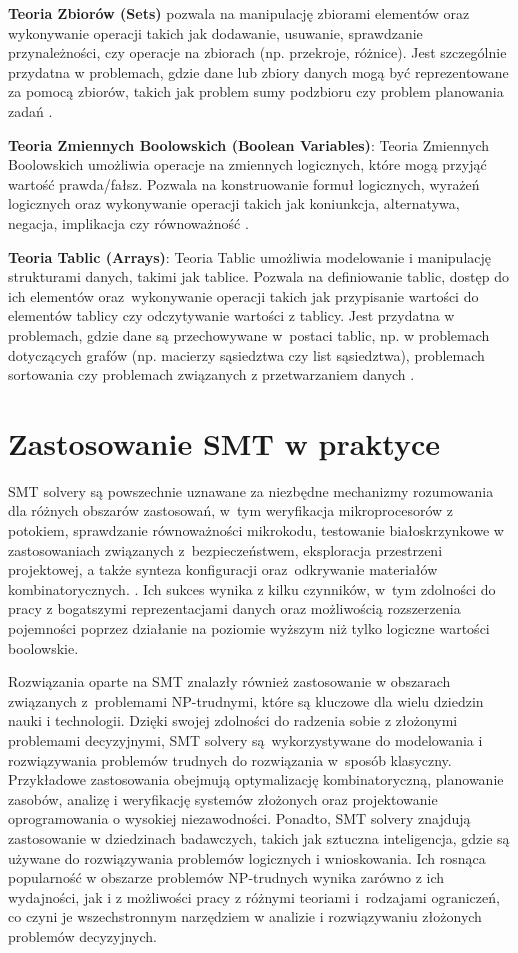 \textbf{Teoria Zbiorów (Sets)} pozwala na manipulację zbiorami elementów oraz wykonywanie operacji takich jak dodawanie, usuwanie, sprawdzanie przynależności, czy operacje na zbiorach (np. przekroje, różnice). Jest szczególnie przydatna w problemach, gdzie dane lub zbiory danych mogą być reprezentowane za pomocą zbiorów, takich jak problem sumy podzbioru czy problem planowania zadań \cite{Smith09}.

\textbf{Teoria Zmiennych Boolowskich (Boolean Variables)}:
Teoria Zmiennych Boolowskich umożliwia operacje na zmiennych logicznych, które mogą przyjąć wartość prawda/fałsz. Pozwala na konstruowanie formuł logicznych, wyrażeń logicznych oraz wykonywanie operacji takich jak koniunkcja, alternatywa, negacja, implikacja czy równoważność \cite{Bryant92}. 

\textbf{Teoria Tablic (Arrays)}:
Teoria Tablic umożliwia modelowanie i manipulację strukturami danych, takimi jak tablice. Pozwala na definiowanie tablic, dostęp do ich elementów oraz~wykonywanie operacji takich jak przypisanie wartości do elementów tablicy czy odczytywanie wartości z tablicy. Jest przydatna w problemach, gdzie dane są przechowywane w~postaci tablic, np. w problemach dotyczących grafów (np. macierzy sąsiedztwa czy list sąsiedztwa), problemach sortowania czy problemach związanych z przetwarzaniem danych \cite{CormenLRS0023376}.

\section{Zastosowanie SMT w praktyce}
SMT solvery są powszechnie uznawane za niezbędne mechanizmy rozumowania dla różnych obszarów zastosowań, w~tym weryfikacja mikroprocesorów z potokiem, sprawdzanie równoważności mikrokodu, testowanie białoskrzynkowe w zastosowaniach związanych z~bezpieczeństwem, eksploracja przestrzeni projektowej, a także synteza konfiguracji oraz~odkrywanie materiałów kombinatorycznych. \cite{BarbosaBBKLMMMN22}. Ich sukces wynika z kilku czynników, w~tym zdolności do pracy z bogatszymi reprezentacjami danych oraz możliwością rozszerzenia pojemności poprzez działanie na poziomie wyższym niż tylko logiczne wartości boolowskie. 

Rozwiązania oparte na SMT znalazły również zastosowanie w obszarach związanych z~problemami NP-trudnymi, które są kluczowe dla wielu dziedzin nauki i technologii. Dzięki swojej zdolności do radzenia sobie z złożonymi problemami decyzyjnymi, SMT solvery są~wykorzystywane do modelowania i rozwiązywania problemów trudnych do rozwiązania w~sposób klasyczny. Przykładowe zastosowania obejmują optymalizację kombinatoryczną, planowanie zasobów, analizę i weryfikację systemów złożonych oraz projektowanie oprogramowania o wysokiej niezawodności. Ponadto, SMT solvery znajdują zastosowanie w dziedzinach badawczych, takich jak sztuczna inteligencja, gdzie są używane do rozwiązywania problemów logicznych i wnioskowania. Ich rosnąca popularność w obszarze problemów NP-trudnych wynika zarówno z ich wydajności, jak i z możliwości pracy z różnymi teoriami i~rodzajami ograniczeń, co czyni je wszechstronnym narzędziem w analizie i rozwiązywaniu złożonych problemów decyzyjnych.
